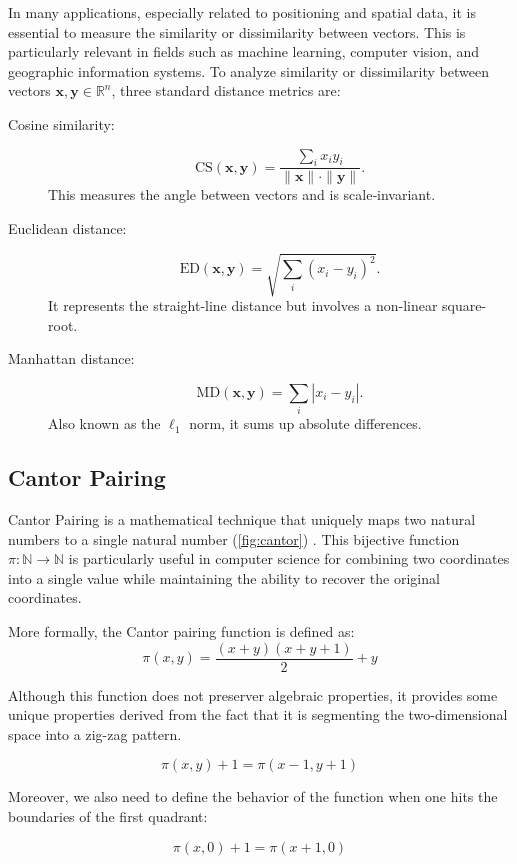 In many applications, especially related to positioning and spatial data, it is essential to measure the similarity or dissimilarity between vectors. This is particularly relevant in fields such as machine learning, computer vision, and geographic information systems. To analyze similarity or dissimilarity between vectors $\mathbf{x}, \mathbf{y} \in \mathbb{R}^n$, three standard distance metrics are:

\begin{description}
  \item[Cosine similarity:]
  \[
    \mathrm{CS}(\mathbf{x}, \mathbf{y}) 
    = \frac{\sum_i x_i y_i}{\|\mathbf{x}\| \cdot \|\mathbf{y}\|}.
  \]
  This measures the angle between vectors and is scale‑invariant.

  \item[Euclidean distance:]
  \[
    \mathrm{ED}(\mathbf{x}, \mathbf{y}) 
    = \sqrt{\sum_i (x_i - y_i)^2}.
  \]
  It represents the straight-line distance but involves a non-linear square-root.

  \item[Manhattan distance:]
  \[
    \mathrm{MD}(\mathbf{x}, \mathbf{y}) 
    = \sum_i |x_i - y_i|.
  \]
  Also known as the $\ell_1$ norm, it sums up absolute differences.
\end{description}
\subsection{Cantor Pairing}

Cantor Pairing is a mathematical technique that uniquely maps two natural numbers to a single natural number (\cref{fig:cantor}) . This bijective function $\pi: \mathbb{N} \to \mathbb{N}$ is particularly useful in computer science for combining two coordinates into a single value while maintaining the ability to recover the original coordinates.

More formally, the Cantor pairing function is defined as:
\[
    \pi(x, y) = \frac{(x + y)(x + y + 1)}{2} + y
\]

Although this function does not preserver algebraic properties, it provides some unique properties derived from the fact that it is segmenting the two-dimensional space into a zig-zag pattern.

\[
    \pi(x, y) + 1 = \pi(x - 1, y + 1)
\]

Moreover, we also need to define the behavior of the function when one hits the boundaries of the first quadrant:

\[
    \pi(x, 0) + 1 = \pi(x + 1, 0)
\]

